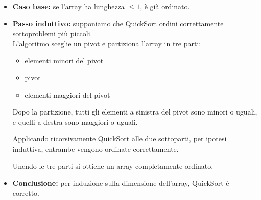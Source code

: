 \documentclass[a4paper,12pt]{article}
\begin{document}
\begin{itemize}
    \item \textbf{Caso base:} se l'array ha lunghezza $\le 1$, è già ordinato.

    \item \textbf{Passo induttivo:} supponiamo che QuickSort ordini correttamente sottoproblemi più piccoli.\\
    L'algoritmo sceglie un pivot e partiziona l'array in tre parti:
    \begin{itemize}
        \item elementi minori del pivot
        \item pivot
        \item elementi maggiori del pivot
    \end{itemize}

    Dopo la partizione, tutti gli elementi a sinistra del pivot sono minori o uguali, e quelli a destra sono maggiori o uguali.

    Applicando ricorsivamente QuickSort alle due sottoparti, per ipotesi induttiva, entrambe vengono ordinate correttamente.

    Unendo le tre parti si ottiene un array completamente ordinato.

    \item \textbf{Conclusione:} per induzione sulla dimensione dell'array, QuickSort è corretto.
\end{itemize}
\end{document}
